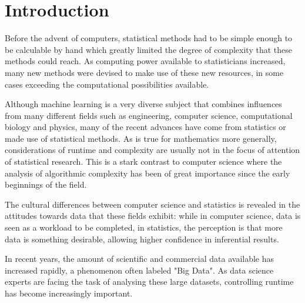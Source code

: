 \documentclass[a4paper,12pt,twoside,openright]{report}
\begin{document}
\pagestyle{empty}
\singlespacing

\onehalfspacing

\singlespacing




\setcounter{page}{0}
\pagestyle{plain}
\tableofcontents
\listoffigures

\onehalfspacing


\chapter{Introduction}

\setcounter{page}{1}

Before the advent of computers, statistical methods had to be simple enough to be calculable by hand which greatly limited the degree of complexity that these methods could reach. As computing power available to statisticians increased, many new methods were devised to make use of these new resources, in some cases exceeding the computational possibilities available. %

Although machine learning is a very diverse subject that combines influences from many different fields such as engineering, computer science, computational biology and physics, many of the recent advances have come from statistics or made use of statistical methods. As is true for mathematics more generally, considerations of runtime and complexity are usually not in the focus of attention of statistical research. This is a stark contrast to computer science where the analysis of algorithmic complexity has been of great importance since the early beginnings of the field.

The cultural differences between computer science and statistics is revealed in the attitudes towards data that these fields exhibit: while in computer science, data is seen as a workload to be completed, in statistics, the perception is that more data is something desirable, allowing higher confidence in inferential results.

In recent years, the amount of scientific and commercial data available has increased rapidly, a phenomenon often labeled "Big Data". As data science experts are facing the task of analysing these large datasets, controlling runtime has become increasingly important.
\end{document}
